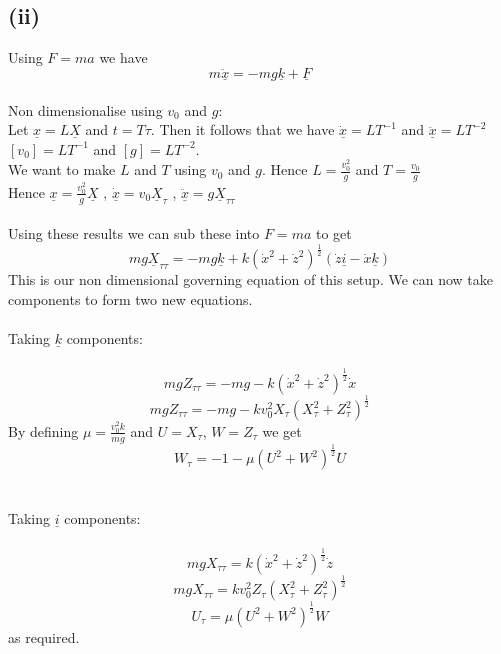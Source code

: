 \documentclass[1pt]{article}
\begin{document}
\subsection*{(ii)}
Using $F=ma$ we have $$m\ddot{\underline{x}}=-mg\underline{k}+\underline{F}$$
\\ Non dimensionalise using $v_0$ and $g$: 
\\ Let $\underline{x}=L\underline{X}$ and $t=T\tau$. Then it follows that we have $\underline{\dot{x}}=LT^{-1}$ and $\underline{\ddot{x}}=LT^{-2}$
\\ $[v_0]=LT^{-1}$ and $[g]=LT^{-2}$. 
\\ We want to make $L$ and $T$ using $v_0$ and $g$. Hence $L=\frac{v_0^2}{g}$ and $T=\frac{v_0}{g}$
\\ Hence $\underline{x}=\frac{v_0^2}{g}\underline{X}$ , $\underline{\dot{x}}=v_0\underline{X}_{\tau}$ , $\underline{\ddot{x}}=g\underline{X}_{\tau\tau}$
\\ 
\\ Using these results we can sub these into $F=ma$ to get $$mg\underline{X}_{\tau\tau}=-mg\underline{k}+k(\dot{x}^2+\dot{z}^2)^{\frac{1}{2}}(\dot{z}\underline{i}-\dot{x}\underline{k})$$ This is our non dimensional governing equation of this setup. We can now take components to form two new equations.
\\
\\ Taking $\underline{k}$ components:
\\
\\  $$mgZ_{\tau\tau}=-mg-k(\dot{x}^2+\dot{z}^2)^{\frac{1}{2}}\dot{x}$$
$$mgZ_{\tau\tau}=-mg-kv_0^2X_{\tau}(X_{\tau}^2+Z_{\tau}^2)^{\frac{1}{2}}$$
By defining $\mu=\frac{v_0^2k}{mg}$ and  $U = X_{\tau}$, $W = Z_{\tau}$ we get
$$ W_{\tau}=-1-\mu(U^2+W^2)^{\frac{1}{2}}U$$
\\
\\ Taking $\underline{i}$ components:
\\
\\ $$mgX_{\tau\tau}=k(\dot{x}^2+\dot{z}^2)^{\frac{1}{2}}\dot{z}$$
$$mgX_{\tau\tau}=kv_0^2Z_{\tau}(X_{\tau}^2+Z_{\tau}^2)^{\frac{1}{2}}$$
$$U_{\tau}=\mu(U^2+W^2)^{\frac{1}{2}}W$$ as required.
\end{document}
